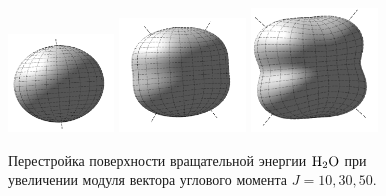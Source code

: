 \begin{figure}[!ht]
  \centering
	\includegraphics[width=0.25\textwidth]{../pictures/Rigid_RES_10.png}
	\includegraphics[width=0.3\textwidth]{../pictures/Rigid_RES_30.png}
	\includegraphics[width=0.3\textwidth]{../pictures/Rigid_RES_50.png}
	\caption{Перестройка поверхности вращательной энергии $\ce{H2O}$ при увеличении модуля вектора углового момента $J=10, 30, 50$.}
	\label{fig:triatomic}
\end{figure}